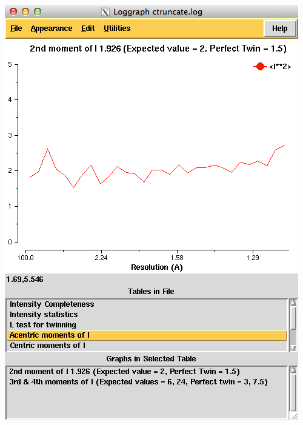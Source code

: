 \documentclass[a4paper, 11pt]{article}
\begin{document}
\includegraphics[scale = 0.5]{figures/E4.png}
\end{document}
